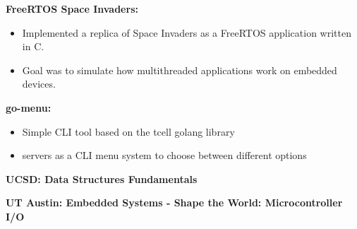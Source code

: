 \begin{cventries}
  \cventry
    {} %
    {} %
    {} %
    {} %
    {
      \begin{cvitems} %
        \item { \textbf{FreeRTOS Space Invaders:}
                \begin{itemize}
                    \item Implemented a replica of Space Invaders as a FreeRTOS application written in C.
                    \item Goal was to simulate how multithreaded applications work on embedded devices.
                \end{itemize}
              }
        \item { \textbf{go-menu:}
                \begin{itemize}
                    \item Simple CLI tool based on the tcell golang library
                    \item servers as a CLI menu system to choose between different options
                \end{itemize}
              }
          \vspace{1.5mm}
          \item { \textbf{UCSD: Data Structures Fundamentals} }
          \vspace{1.5mm}
          \item { \textbf{UT Austin: Embedded Systems - Shape the World: Microcontroller I/O} }
       \end{cvitems}
    }
\end{cventries}
